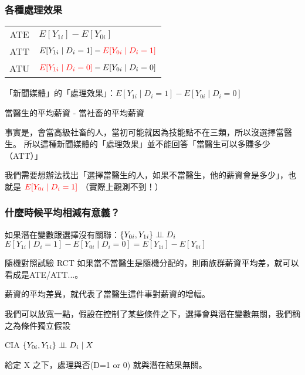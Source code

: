 \begin{frame}
    \frametitle{各種處理效果}
    \begin{table}
        \centering
        \begin{tabular}{c | l}
            \hline
            ATE & $E[Y_{1i}] - E[Y_{0i}]$ \\
            ATT & $E[Y_{1i} \mid D_i=1] - \begingroup \color{red} E[Y_{0i} \mid D_i=1]\endgroup$ \\
            ATU & $\begingroup \color{red}E[Y_{1i} \mid D_i=0] \endgroup -  E[Y_{0i} \mid D_i=0]$ \\
            \hline
        \end{tabular}
    \end{table}
    \pause
    \vfill
    「新聞媒體」的「處理效果」：$E[Y_{1i} \mid D_i=1] - E[Y_{0i} \mid D_i=0]$

    \small
    當醫生的平均薪資 - 當社畜的平均薪資 

    事實是，會當高級社畜的人，當初可能就因為技能點不在三類，所以沒選擇當醫生。
    所以這種新聞媒體的「處理效果」並不能回答「當醫生可以多賺多少（ATT）」
    
    我們需要想辦法找出「選擇當醫生的人，如果不當醫生，他的薪資會是多少」，也就是
    $\begingroup \color{red} E[Y_{0i} \mid D_i=1]\endgroup$ （實際上觀測不到！）
    \normalsize
    
\end{frame}

\begin{frame}
    \frametitle{什麼時候平均相減有意義？}
    
    如果潛在變數跟選擇沒有關聯：$\{Y_{0i}, Y_{1i}\} \perp \!\!\! \perp D_i$
    $E[Y_{1i} \mid D_i=1] - E[Y_{0i} \mid D_i=0] = E[Y_{1i}] - E[Y_{0i}]$

    \pause
    \begin{block}{隨機對照試驗 RCT}
        如果當不當醫生是隨機分配的，則兩族群薪資平均差，就可以看成是ATE/ATT...。

        薪資的平均差異，就代表了當醫生這件事對薪資的增幅。
    \end{block}
    \pause
    我們可以放寬一點，假設在控制了某些條件之下，選擇會與潛在變數無關，我們稱之為條件獨立假設
    \begin{block}{CIA}
        $\{Y_{0i}, Y_{1i}\} \perp \!\!\! \perp D_i \mid X$

        給定 X 之下，處理與否(D=1 or 0) 就與潛在結果無關。
    \end{block}


\end{frame}

